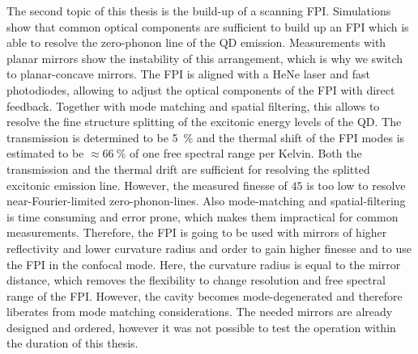 The second topic of this thesis is the build-up of a scanning \ac{FPI}.
Simulations show that common optical components are sufficient to build up an \ac{FPI} which is able to resolve the zero-phonon line of the \ac{QD} emission.
Measurements with planar mirrors show the instability of this arrangement, which is why we switch to planar-concave mirrors.
The \ac{FPI} is aligned with a HeNe laser and fast photodiodes, allowing to adjust the optical components of the \ac{FPI} with direct feedback.
Together with mode matching and spatial filtering, this allows to resolve the fine structure splitting of the excitonic energy levels of the \ac{QD}.
The transmission is determined to be \SI{5}{\percent} and the thermal shift of the \ac{FPI} modes is estimated to be $\approx \SI{66}{\percent}$ of one free spectral range per Kelvin.
Both the transmission and the thermal drift are sufficient for resolving the splitted excitonic emission line. However, the measured finesse of $45$ is too low to resolve near-Fourier-limited zero-phonon-lines.
Also mode-matching and spatial-filtering is time consuming and error prone, which makes them impractical for common measurements.
Therefore, the \ac{FPI} is going to be used with mirrors of higher reflectivity and lower curvature radius and order to gain higher finesse and to use the \ac{FPI} in the confocal mode.
Here, the curvature radius is equal to the mirror distance, which removes the flexibility to change resolution and free spectral range of the \ac{FPI}.
However, the cavity becomes mode-degenerated and therefore liberates from mode matching considerations.
The needed mirrors are already designed and ordered, however it was not possible to test the operation within the duration of this thesis.

